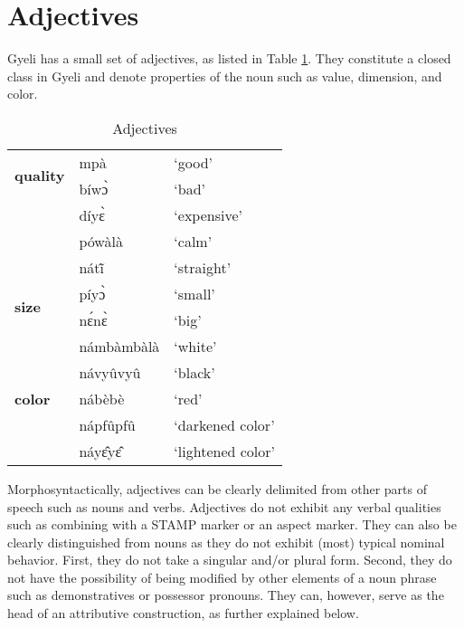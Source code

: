 \section{Adjectives}
\label{sec:QUAL}


Gyeli has a small set of adjectives, as listed in Table \ref{Tab:QUAL}. They constitute a closed class in Gyeli and denote properties of the noun such as value, dimension, and color. 

\begin{table} 
\centering
\begin{tabular}{m|p{3cm}p{3.5cm}}
 \midrule
\multirow{2}{*}{\bfseries quality} & mpà &  `good' \\
 & bíwɔ̀ &  `bad' \\
 & díyɛ̀  & `expensive' \\
 & pówàlà & `calm' \\
 & nátĩ̂ & `straight' \\
 \midrule
\multirow{2}{*}{\bfseries size}  & píyɔ̀ &  `small' \\
 & nɛ́nɛ̀ &  `big' \\
 \midrule
\multirow{5}{*}{\bfseries color} & námbàmbàlà & `white' \\
 & návyûvyû & `black' \\
 & nábèbè & `red' \\
 & nápfûpfû & `darkened color' \\
 & náyɛ̂yɛ̂ & `lightened color' \\
 \midrule
\end{tabular}
\caption{Adjectives}
\label{Tab:QUAL}
\end{table}





Morphosyntactically, adjectives can be clearly delimited from other parts of speech such as nouns and verbs. Adjectives do not exhibit any verbal qualities such as combining with a STAMP marker or an aspect marker. They can also be clearly distinguished from nouns as they do not exhibit (most) typical nominal behavior. First, they do not take a singular and/or plural form. Second, they do not have the possibility of being modified by other elements of a noun phrase such as demonstratives or possessor pronouns. They can, however, serve as the head of an attributive construction, as further explained below.

